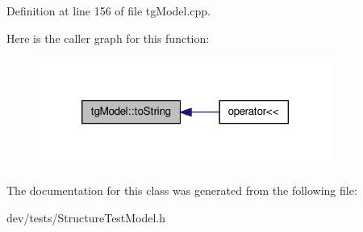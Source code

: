 Definition at line 156 of file tg\-Model.\-cpp.



Here is the caller graph for this function\-:\nopagebreak
\begin{figure}[H]
\begin{center}
\leavevmode
\includegraphics[width=272pt]{classtg_model_af37b0c1a6d4060bfe0bb9b5038a17725_icgraph}
\end{center}
\end{figure}




The documentation for this class was generated from the following file\-:\begin{DoxyCompactItemize}
\item 
dev/tests/Structure\-Test\-Model.\-h\end{DoxyCompactItemize}

